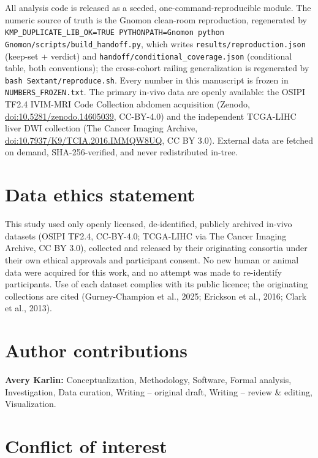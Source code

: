 \documentclass[11pt]{article}
\begin{document}
All analysis code is released as a seeded, one-command-reproducible module. The numeric
source of truth is the Gnomon clean-room reproduction, regenerated by
\texttt{KMP\_DUPLICATE\_LIB\_OK=TRUE PYTHONPATH=Gnomon python Gnomon/scripts/build\_handoff.py},
which writes \texttt{results/reproduction.json} (keep-set + verdict) and
\texttt{handoff/conditional\_coverage.json} (conditional table, both conventions); the
cross-cohort railing generalization is regenerated by \texttt{bash Sextant/reproduce.sh}.
Every number in this manuscript is frozen in \texttt{NUMBERS\_FROZEN.txt}. The primary
in-vivo data are openly available: the OSIPI TF2.4 IVIM-MRI Code Collection abdomen
acquisition (Zenodo, \href{https://doi.org/10.5281/zenodo.14605039}{doi:10.5281/zenodo.14605039},
CC-BY-4.0) and the independent TCGA-LIHC liver DWI collection (The Cancer Imaging Archive,
\href{https://doi.org/10.7937/K9/TCIA.2016.IMMQW8UQ}{doi:10.7937/K9/TCIA.2016.IMMQW8UQ},
CC BY 3.0). External data are fetched on demand, SHA-256-verified, and never redistributed
in-tree.

\section*{Data ethics statement}

This study used only openly licensed, de-identified, publicly archived in-vivo datasets
(OSIPI TF2.4, CC-BY-4.0; TCGA-LIHC via The Cancer Imaging Archive, CC BY 3.0), collected
and released by their originating consortia under their own ethical approvals and
participant consent. No new human or animal data were acquired for this work, and no
attempt was made to re-identify participants. Use of each dataset complies with its
public licence; the originating collections are cited (Gurney-Champion et al., 2025;
Erickson et al., 2016; Clark et al., 2013).

\section*{Author contributions}

\textbf{Avery Karlin:} Conceptualization, Methodology, Software, Formal analysis,
Investigation, Data curation, Writing -- original draft, Writing -- review \& editing,
Visualization.

\section*{Conflict of interest}
\end{document}
